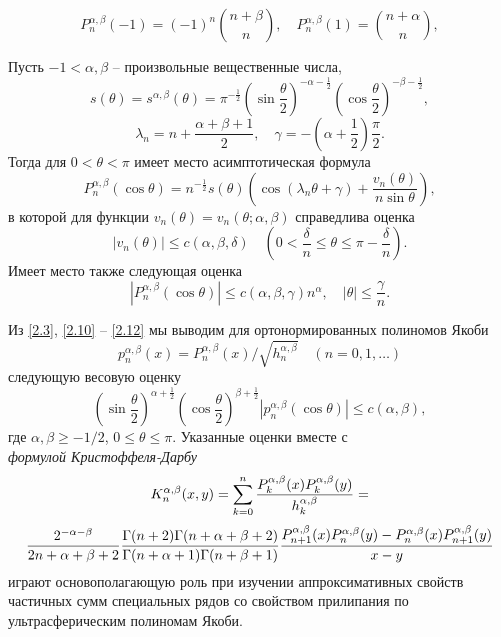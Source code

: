 \begin{equation}\label{2.9}
P_n^{\alpha,\beta}(-1)=(-1)^n {n+\beta\choose n},\quad P_n^{\alpha,\beta}(1)= {n+\alpha\choose n},
\end{equation}


Пусть $-1<\alpha, \beta$ -- произвольные вещественные числа,
$$
s(\theta)=s^{\alpha,\beta}(\theta)=\pi^{-\frac12}
\left(\sin\frac{\theta}{2}\right)^{-\alpha-\frac12}
\left(\cos\frac{\theta}{2}\right)^{-\beta-\frac12},
$$
$$
\lambda_n=n+\frac{\alpha+\beta+1}{2}, \quad\gamma=-
\left(\alpha+\frac{1}{2}\right)\frac{\pi}{2}.
$$
Тогда для $0<\theta<\pi$ имеет место асимптотическая формула
\begin{equation}\label{2.10}
P_n^{\alpha,\beta}(\cos\theta)=n^{-\frac12}s(\theta)
\left(\cos(\lambda_n\theta+\gamma)+
\frac{v_n(\theta)}{n\sin\theta}\right),
\end{equation}
в которой для функции $v_n(\theta)=v_n(\theta;\alpha,\beta)$
справедлива оценка
\begin{equation}\label{2.11}
|v_n(\theta)|\le c(\alpha,\beta,\delta)\quad
 \left(0<\frac{\delta}{n}\le\theta\le\pi-\frac{\delta}{n}\right).
\end{equation}
Имеет место также следующая оценка
\begin{equation}\label{2.12}
|P_n^{\alpha,\beta}(\cos\theta)|\le c(\alpha,\beta,\gamma)n^\alpha, \quad |\theta|\le \frac{\gamma}{n}.
\end{equation}

Из \eqref{2.3}, \eqref{2.10} -- \eqref{2.12} мы выводим для ортонормированных   полиномов Якоби
\begin{equation}\label{2.13}
p_n^{\alpha,\beta}(x)=P_n^{\alpha,\beta}(x)/\sqrt{h_n^{\alpha,\beta}}\quad(n=0,1,\ldots)
\end{equation}
 следующую весовую оценку
\begin{equation}\label{2.14}
\left(\sin\frac{\theta}{2}\right)^{\alpha+\frac12}
\left(\cos\frac{\theta}{2}\right)^{\beta+\frac12}
|p_n^{\alpha,\beta}(\cos\theta)|\le c(\alpha,\beta),
\end{equation}
где $\alpha,\beta\ge-1/2$, $0\le\theta\le\pi$. Указанные оценки вместе с \\
\textit{ формулой Кристоффеля-Дарбу }
$$
 K_n^{\alpha,\beta}(x,y)=
\sum_{k=0}^n{P_k^{\alpha,\beta}(x)P_k^{\alpha,\beta}(y)\over
h_k^{\alpha,\beta}}=
 $$
\begin{equation}\label{2.15}
 {2^{-\alpha-\beta}\over
2n+\alpha+\beta+2} {\Gamma(n+2)\Gamma(n+\alpha+\beta+2)\over
\Gamma(n+\alpha+1)\Gamma(n+\beta+1)}
 {P_{n+1}^{\alpha,\beta}(x)P_n^{\alpha,\beta}(y)-
P_n^{\alpha,\beta}(x)P_{n+1}^{\alpha,\beta}(y)\over x-y}
\end{equation}
играют основополагающую роль при изучении аппроксимативных свойств частичных сумм специальных рядов со свойством прилипания по ультрасферическим полиномам Якоби.

